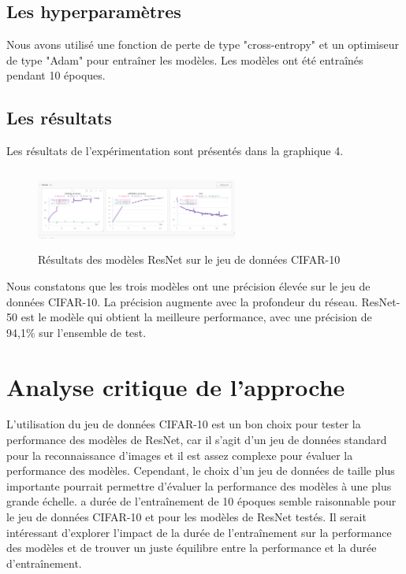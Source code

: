 \documentclass{article}
\begin{document}
\subsection{Les hyperparamètres}

Nous avons utilisé une fonction de perte de type "cross-entropy" et un optimiseur de type "Adam" pour entraîner les modèles. Les modèles ont été entraînés pendant 10 époques.

\subsection{Les résultats}

Les résultats de l'expérimentation sont présentés dans la graphique 4.

\begin{figure}[t]
    \centering
    \includegraphics[width=250,height=100]{./img/result}
    \caption{Résultats des modèles ResNet sur le jeu de données CIFAR-10}
    \label{fig:}
\end{figure}

Nous constatons que les trois modèles ont une précision élevée sur le jeu de données CIFAR-10. La précision augmente avec la profondeur du réseau. ResNet-50 est le modèle qui obtient la meilleure performance, avec une précision de 94,1\% sur l'ensemble de test.

\section{Analyse critique de l'approche}

L'utilisation du jeu de données CIFAR-10 est un bon choix pour tester la performance des modèles de ResNet, car il s'agit d'un jeu de données standard pour la reconnaissance d'images et il est assez complexe pour évaluer la performance des modèles.
Cependant, le choix d'un jeu de données de taille plus importante pourrait permettre d'évaluer la performance des modèles à une plus grande échelle.
a durée de l'entraînement de 10 époques semble raisonnable pour le jeu de données CIFAR-10 et pour les modèles de ResNet testés. Il serait intéressant d'explorer l'impact de la durée de l'entraînement sur la performance des modèles et de trouver un juste équilibre entre la performance et la durée d'entraînement.
\end{document}
